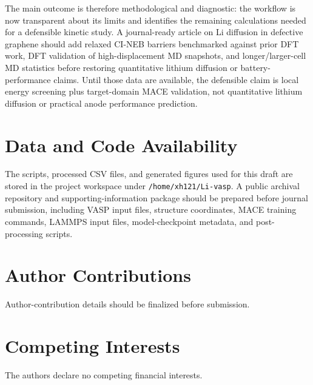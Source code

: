 \documentclass[12pt]{article}
\begin{document}
The main outcome is therefore methodological and diagnostic: the workflow is now transparent about its limits and identifies the remaining calculations needed for a defensible kinetic study. A journal-ready article on Li diffusion in defective graphene should add relaxed CI-NEB barriers benchmarked against prior DFT work, DFT validation of high-displacement MD snapshots, and longer/larger-cell MD statistics before restoring quantitative lithium diffusion or battery-performance claims. Until those data are available, the defensible claim is local energy screening plus target-domain MACE validation, not quantitative lithium diffusion or practical anode performance prediction.

\section*{Data and Code Availability}

The scripts, processed CSV files, and generated figures used for this draft are stored in the project workspace under \texttt{/home/xh121/Li-vasp}. A public archival repository and supporting-information package should be prepared before journal submission, including VASP input files, structure coordinates, MACE training commands, LAMMPS input files, model-checkpoint metadata, and post-processing scripts.

\section*{Author Contributions}

Author-contribution details should be finalized before submission.

\section*{Competing Interests}

The authors declare no competing financial interests.



\end{document}
